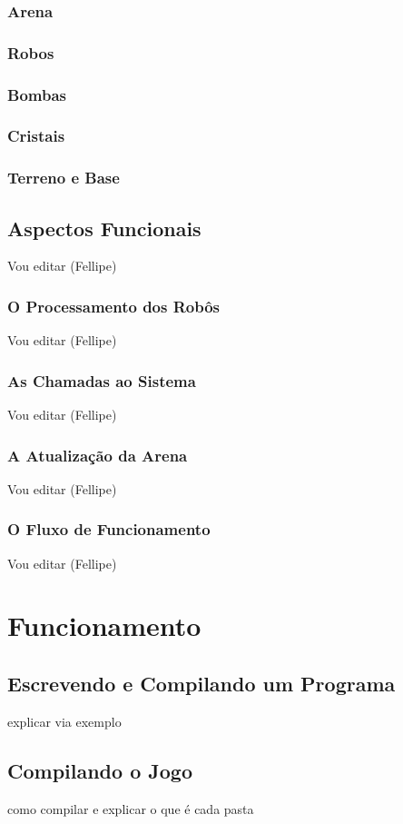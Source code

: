 \documentclass[a4paper]{article}
\begin{document}
\subsubsection{Arena}
\subsubsection{Robos}
\subsubsection{Bombas}
\subsubsection{Cristais}
\subsubsection{Terreno e Base}

\subsection{Aspectos Funcionais}
Vou editar (Fellipe)
\subsubsection{O Processamento dos Robôs}
Vou editar (Fellipe)
\subsubsection{As Chamadas ao Sistema}
Vou editar (Fellipe)
\subsubsection{A Atualização da Arena}
Vou editar (Fellipe)
\subsubsection{O Fluxo de Funcionamento}
Vou editar (Fellipe)

\section{Funcionamento}
\subsection{Escrevendo e Compilando um Programa}
explicar via exemplo
\subsection{Compilando o Jogo}
como compilar e explicar o que é cada pasta
\end{document}
